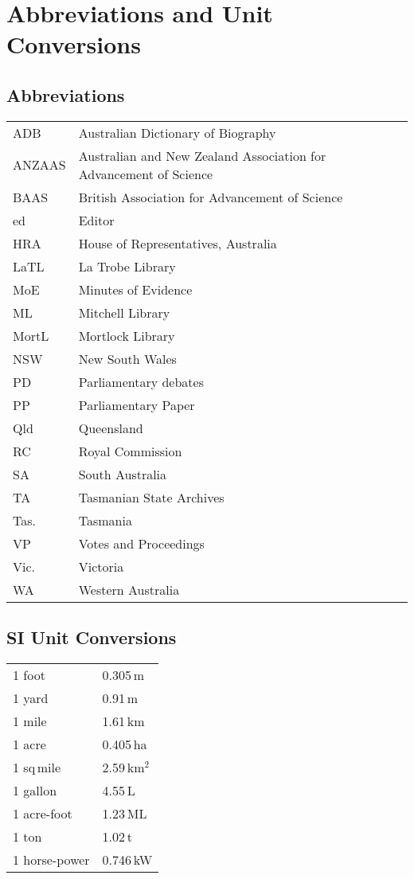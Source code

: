 
\chapter{Abbreviations and Unit Conversions}
\label{ch:abbrev}

\section*{Abbreviations} 

\begin{tabular}{ll}
	ADB	& Australian Dictionary of Biography\\
	ANZAAS	& Australian and New Zealand Association for Advancement of
                              Science\\
       	BAAS	& British Association for Advancement of Science\\
	ed	& Editor\\
	HRA	& House of Representatives, Australia\\
	LaTL	& La Trobe Library\\
	MoE	& Minutes of Evidence\\
	ML	& Mitchell Library\\
	MortL	& Mortlock Library\\
	NSW	& New South Wales\\
	PD	& Parliamentary debates\\
	PP	& Parliamentary Paper\\
	Qld	& Queensland\\
	RC	& Royal Commission\\
	SA	& South Australia\\
	TA	& Tasmanian State Archives\\
	Tas.	& Tasmania\\
	VP	& Votes and Proceedings\\
	Vic.	& Victoria\\
	WA	& Western Australia\\
\end{tabular}

\section*{SI Unit Conversions}

\begin{tabular}{ll}
	1 foot		& 0.305\,m \\
	1 yard		& 0.91\,m  \\
	1 mile		& 1.61\,km \\
	1 acre		& 0.405\,ha \\
	1 sq\,mile	& 2.59\,km$^2$ \\
	1 gallon	& 4.55\,L \\
	1 acre-foot	& 1.23\,ML \\
	1 ton		& 1.02\,t \\
	1 horse-power	& 0.746\,kW \\
\end{tabular}
